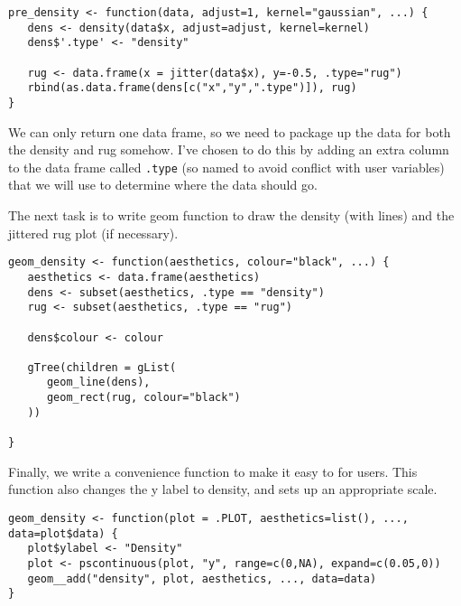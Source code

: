 \begin{verbatim}
pre_density <- function(data, adjust=1, kernel="gaussian", ...) {
   dens <- density(data$x, adjust=adjust, kernel=kernel)
   dens$'.type' <- "density"

   rug <- data.frame(x = jitter(data$x), y=-0.5, .type="rug")
   rbind(as.data.frame(dens[c("x","y",".type")]), rug)
}
\end{verbatim}

We can only return one data frame, so we need to package up the data for both the density and rug somehow.  I've chosen to do this by adding an extra column to the data frame called \texttt{.type} (so named to avoid conflict with user variables) that we will use to determine where the data should go.

The next task is to write geom function to draw the density (with lines) and the jittered rug plot (if necessary).

\begin{verbatim}
geom_density <- function(aesthetics, colour="black", ...) {
   aesthetics <- data.frame(aesthetics)
   dens <- subset(aesthetics, .type == "density")
   rug <- subset(aesthetics, .type == "rug")

   dens$colour <- colour

   gTree(children = gList(
      geom_line(dens),
      geom_rect(rug, colour="black")
   ))

}
\end{verbatim}

Finally, we write a convenience function to make it easy to for users.  This function also changes the y label to density, and sets up an appropriate scale.

\begin{verbatim}
geom_density <- function(plot = .PLOT, aesthetics=list(), ..., data=plot$data) {
   plot$ylabel <- "Density"
   plot <- pscontinuous(plot, "y", range=c(0,NA), expand=c(0.05,0))
   geom__add("density", plot, aesthetics, ..., data=data)
}  
\end{verbatim}



